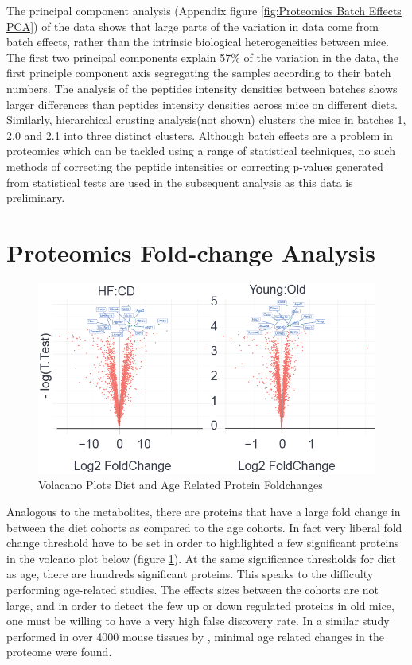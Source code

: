 \documentclass[a4paper,11pt,twoside]{book}
\begin{document}
	The principal component analysis (Appendix figure \ref{fig:Proteomics Batch Effects PCA}) of the data shows that large parts of the variation in data come from batch effects, rather than the intrinsic biological heterogeneities between mice. The first two principal components explain 57\% of the variation in the data, the first principle component axis segregating the samples according to their batch numbers. The analysis of the peptides intensity densities between batches shows larger differences than peptides intensity densities across mice on different diets. Similarly, hierarchical crusting analysis(not shown) clusters the mice in batches 1, 2.0 and 2.1 into three distinct clusters. Although batch effects are a problem in proteomics which can be tackled using a range of statistical techniques\citep{Leek2010TacklingBatchEffects}, no such methods of correcting the peptide intensities or correcting p-values generated from statistical tests are used in the subsequent analysis as this data is preliminary.
		

	\section{Proteomics Fold-change Analysis}
	
    \begin{figure}[htb!]
		\centering
		\includegraphics[width=\linewidth]{3.Proteomics/Protein_foldchanges}
		\caption{Volacano Plots Diet and Age Related Protein Foldchanges}
		\label{volcano plot: Protein Diet and Age Foldchanges}
	\end{figure}
	
	Analogous to the metabolites, there are proteins that have a large fold change in between the diet cohorts as compared to the age cohorts. In fact very liberal fold change threshold have to be set in order to highlighted a few significant proteins in the volcano plot below (figure \ref{volcano plot: Protein Diet and Age Foldchanges}). At the same significance thresholds for diet as age, there are hundreds significant proteins. This speaks to the difficulty performing age-related studies. The effects sizes between the cohorts are not large, and in order to detect the few up or down regulated proteins in old mice, one must be willing to have a very high false discovery rate. In a similar study performed in over 4000 mouse tissues by \citeauthor{Walther2011AccurateQuantification}, minimal age related changes in the proteome were found. 
	
\end{document}
